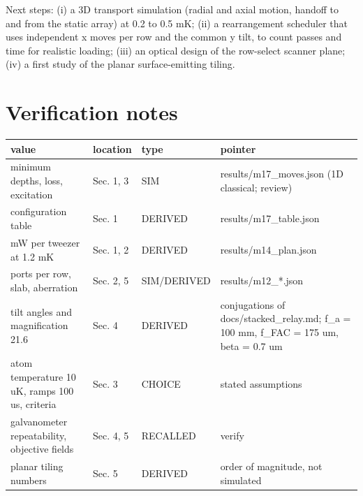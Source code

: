 Next steps: (i) a 3D transport simulation (radial and axial motion,
handoff to and from the static array) at 0.2 to 0.5 mK; (ii) a
rearrangement scheduler that uses independent x moves per row and the
common y tilt, to count passes and time for realistic loading; (iii) an
optical design of the row-select scanner plane; (iv) a first study of
the planar surface-emitting tiling.

\hypertarget{verification-notes}{%
\section{Verification notes}\label{scaling_beyond-verification-notes}}

{\footnotesize
\begin{longtable}[]{@{}>{\raggedright\arraybackslash}p{0.284\dimexpr(\linewidth-8\tabcolsep)\relax}>{\raggedright\arraybackslash}p{0.136\dimexpr(\linewidth-8\tabcolsep)\relax}>{\raggedright\arraybackslash}p{0.185\dimexpr(\linewidth-8\tabcolsep)\relax}>{\raggedright\arraybackslash}p{0.395\dimexpr(\linewidth-8\tabcolsep)\relax}@{}}
\toprule\noalign{}
value & location & type & pointer \\
\midrule\noalign{}
\endhead
\bottomrule\noalign{}
\endlastfoot
minimum depths, loss, excitation & Sec. 1, 3 & SIM &
results/m17\_moves.json (1D classical; review) \\
configuration table & Sec. 1 & DERIVED & results/m17\_table.json \\
57 mW per tweezer at 1.2 mK & Sec. 1, 2 & DERIVED &
results/m14\_plan.json \\
ports per row, slab, aberration & Sec. 2, 5 & SIM/DERIVED &
results/m12\_*.json \\
tilt angles and magnification 21.6 & Sec. 4 & DERIVED & conjugations of
docs/stacked\_relay.md; f\_a = 100 mm, f\_FAC = 175 um, beta = 0.7 um \\
atom temperature 10 uK, ramps 100 us, criteria & Sec. 3 & CHOICE &
stated assumptions \\
galvanometer repeatability, objective fields & Sec. 4, 5 & RECALLED &
verify \\
planar tiling numbers & Sec. 5 & DERIVED & order of magnitude, not
simulated \\
\end{longtable}
}
